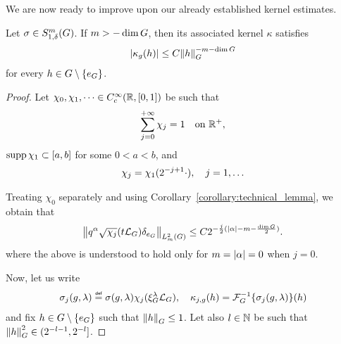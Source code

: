 We are now ready to improve upon our already established kernel estimates.

\begin{theorem}[Kernel estimates when $\rho = 1$]
\label{theorem:kernel_estimates_revisited}
    Let $\sigma \in \SymbolClass m {1, \delta}$.
    If $m > -\dim \Group$,
    then its associated kernel $\kappa$ satisfies
    \begin{align*}
        \abs {\kappa_g(h)}
        \leq C \norm [\Group] h^{-m - \dim \Group}
    \end{align*}
    for every $h \in \Group \setminus \{e_\Group\}$.
\end{theorem}
\begin{proof}
    Let $\chi_0, \chi_1, \dots \in C^\infty_c (\R, [0, 1])$ be such that
    \begin{align*}
        \sum_{j = 0}^{+\infty} \chi_j = 1
        \quad \text{on } \R^+,
    \end{align*}
    $\supp \chi_1 \subset [a, b]$ for some $0 < a < b$, and
    \begin{align*}
        \chi_j = \chi_1(2^{-j + 1} \dummy),
        \quad j = 1, \dots
    \end{align*}

    Treating $\chi_0$ separately and using Corollary~\ref{corollary:technical_lemma},
    we obtain that
    \begin{align}
        \norm [\Sobolev m] {
        q^\alpha \sqrt {\chi_j}(t \Laplacian) \delta_{e_\Group}
        }
        \leq
        C 2^{-\frac j 2 (\abs \alpha - m - \frac {\dim \Group} 2)}.
        \label{eq:Littlewood-Paley_bounds}
    \end{align}
    where the above is understood to hold only for $m = \abs \alpha = 0$ when $j = 0$.

    Now,
    let us write
    \begin{align*}
        \sigma_j(g, \lambda)
        \defeq
        \sigma(g, \lambda)
        \chi_j(\Rep \lambda \Laplacian),
        \quad
        \kappa_{j, g}(h) = \InverseFourier \{\sigma_j(g, \lambda)\}(h)
    \end{align*}
    and fix $h \in \Group \setminus \{e_\Group\}$ such that $\norm [\Group] h \leq 1$.
    Let also $l \in \N$ be such that $\norm [\Group] h^2 \in (2^{-l - 1}, 2^{-l}]$.


\end{proof}
